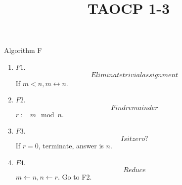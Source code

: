 \documentclass{article}
\title{TAOCP 1\mbox{-}3}
\begin{document}
\maketitle

Algorithm F

\begin{enumerate}
\item \( F1 \). \[ Eliminate trivial assignment \] If \( m < n, m \leftrightarrow n \).
\item \( F2 \). \[ Find remainder \] \( r := m \mod n \).
\item \( F3 \). \[ Is it zero? \] If \( r = 0 \), terminate, answer is \( n \).
\item \( F4 \). \[ Reduce \] \( m \leftarrow n, n \leftarrow r \). Go to F2.
\end{enumerate}
\end{document}
